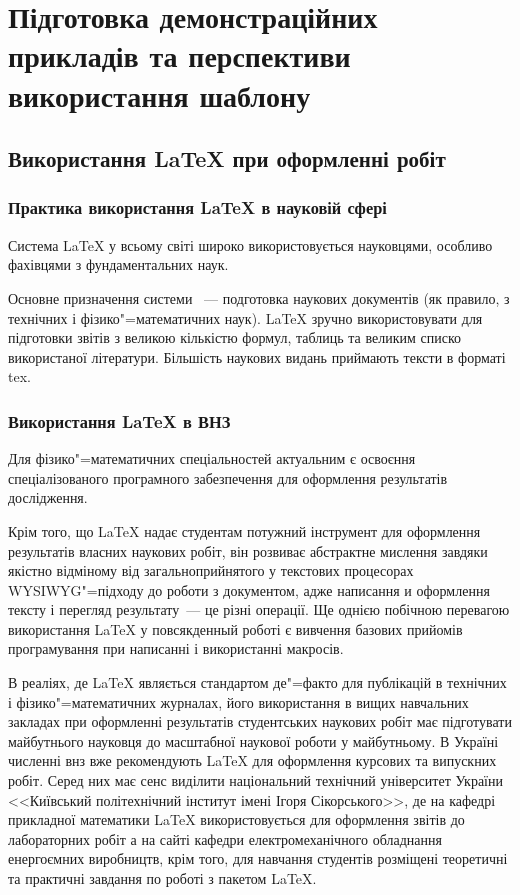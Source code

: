\chapter{Підготовка демонстраційних прикладів та перспективи використання шаблону} 
\label{chap:first}

\section{Використання \LaTeX{} при оформленні робіт}

\subsection{Практика використання \LaTeX{} в науковій сфері}

Система \LaTeX{} у всьому світі широко використовується науковцями, особливо фахівцями з фундаментальних наук.

Основне призначення системи ~--- подготовка наукових документів (як правило, з технічних і фізико"=математичних наук). \LaTeX{} зручно використовувати для підготовки звітів з великою кількістю формул, таблиць та великим списко використаної літератури. Більшість наукових видань приймають тексти в форматі tex.

\subsection{Використання \LaTeX{} в ВНЗ}

Для фізико"=математичних спеціальностей актуальним є освоєння спеціалізованого програмного забезпечення для оформлення результатів дослідження. 

Крім того, що \LaTeX{} надає студентам потужний інструмент для оформлення результатів власних наукових робіт, він розвиває абстрактне мислення завдяки якістно відміному від загальноприйнятого у текстових процесорах WYSIWYG"=підходу до роботи з документом, адже написання и оформлення тексту і перегляд результату~--- це різні операції. Ще однією побічною перевагою використання \LaTeX{} у повсякденный роботі є вивчення базових прийомів програмування при написанні і використанні макросів.

В реаліях, де \LaTeX{} являється стандартом де"=факто для публікацій в технічних і фізико"=математичних журналах, його використання в вищих навчальних закладах при оформленні результатів студентських наукових робіт має підготувати майбутнього науковця до масштабної наукової роботи у майбутньому. В Україні численні внз вже рекомендують \LaTeX{} для оформлення курсових та випускних робіт. Серед них має сенс виділити національний технічний університет України <<Київський політехнічний інститут імені Ігоря Сікорського>>, де на кафедрі прикладної математики \LaTeX{} використовується для оформлення звітів до лабораторних робіт а на сайті кафедри електромеханічного обладнання енергоємних виробництв, крім того, для навчання студентів розміщені теоретичні та практичні завдання по роботі з пакетом \LaTeX{}.

